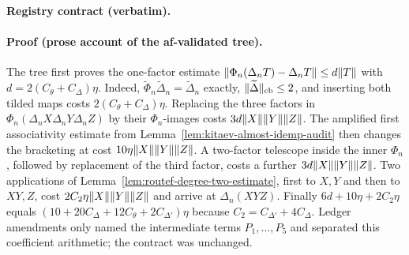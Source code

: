 \noindent\textbf{Registry contract (verbatim).}

\paragraph{Proof (prose account of the af-validated tree).}
The tree first proves the one-factor estimate
$\lVert \Phi_n(\Delta_nT)-\Delta_nT\rVert\le d\lVert T\rVert$ with
$d=2(C_\theta+C_\Delta)\eta$.  Indeed,
$\widetilde\Phi_n\widetilde\Delta_n=\widetilde\Delta_n$ exactly,
$\lVert \widetilde\Delta\rVert_{\mathrm{cb}}\le2$, and inserting both tilded maps costs
$2(C_\theta+C_\Delta)\eta$.  Replacing the three factors in
$\Phi_n(\Delta_nX\Delta_nY\Delta_nZ)$ by their $\Phi_n$-images costs $3d\lVert X\rVert\lVert Y\rVert\lVert Z\rVert$.
The amplified first associativity estimate from Lemma~\ref{lem:kitaev-almost-idemp-audit}
then changes the bracketing at cost $10\eta\lVert X\rVert\lVert Y\rVert\lVert Z\rVert$.
A two-factor telescope inside the inner $\Phi_n$, followed by replacement of the third
factor, costs a further $3d\lVert X\rVert\lVert Y\rVert\lVert Z\rVert$.  Two applications of
Lemma~\ref{lem:routef-degree-two-estimate}, first to $X,Y$ and then to $XY,Z$, cost
$2C_2\eta\lVert X\rVert\lVert Y\rVert\lVert Z\rVert$ and arrive at $\Delta_n(XYZ)$.
Finally $6d+10\eta+2C_2\eta$ equals
$(10+20C_\Delta+12C_\theta+2C_{\Delta'})\eta$ because
$C_2=C_{\Delta'}+4C_\Delta$.  Ledger amendments only named the intermediate
terms $P_1,\ldots,P_5$ and separated this coefficient arithmetic; the contract was unchanged.
